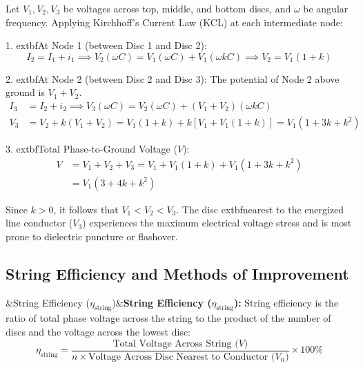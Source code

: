 \documentclass[11pt,a4paper]{article}
\newenvironment{Tip}[1][Key Engineering Insight]{\begin{tcolorbox}[tipbox, title=#1]}{\end{tcolorbox}}
\newenvironment{Def}[1][]{\begin{tcolorbox}[defbox]\ifx&#1&\else\textbf{\color{AnthOrange}#1:}\enspace\fi}{\end{tcolorbox}}
\newenvironment{Deriv}[1][Mathematical Derivation]{\begin{tcolorbox}[derivbox, title=#1]}{\end{tcolorbox}}
\begin{document}
\begin{Deriv}[Mathematical Derivation of Disc Voltages (3-Unit String)]
Let $V_1, V_2, V_3$ be voltages across top, middle, and bottom discs, and $\omega$ be angular frequency.
Applying Kirchhoff's Current Law (KCL) at each intermediate node:

1. 	extbf{At Node 1 (between Disc 1 and Disc 2):}
\begin{equation}
  I_2 = I_1 + i_1 \implies V_2 (\omega C) = V_1 (\omega C) + V_1 (\omega k C) \implies V_2 = V_1 (1 + k)
\end{equation}

2. 	extbf{At Node 2 (between Disc 2 and Disc 3):}
The potential of Node 2 above ground is $V_1 + V_2$.
\begin{align}
  I_3 &= I_2 + i_2 \implies V_3 (\omega C) = V_2 (\omega C) + (V_1 + V_2)(\omega k C) \nonumber\\
  V_3 &= V_2 + k (V_1 + V_2) = V_1 (1 + k) + k [V_1 + V_1(1 + k)] = V_1 \left( 1 + 3k + k^2 \right)
\end{align}

3. 	extbf{Total Phase-to-Ground Voltage ($V$):}
\begin{align}
  V &= V_1 + V_2 + V_3 = V_1 + V_1(1 + k) + V_1(1 + 3k + k^2) \nonumber\\
    &= V_1 \left( 3 + 4k + k^2 \right)
\end{align}
\end{Deriv}

\begin{Tip}[Key Observation: Non-Uniform Voltage Distribution]
Since $k > 0$, it follows that $V_1 < V_2 < V_3$. The disc 	extbf{nearest to the energized line conductor ($V_3$) experiences the maximum electrical voltage stress} and is most prone to dielectric puncture or flashover.
\end{Tip}

\subsection{String Efficiency and Methods of Improvement}

\begin{Def}[String Efficiency ($\eta_{\text{string}}$)]
String efficiency is the ratio of total phase voltage across the string to the product of the number of discs and the voltage across the lowest disc:
\begin{equation}
  \eta_{\text{string}} = \frac{\text{Total Voltage Across String ($V$)}}{n \times \text{Voltage Across Disc Nearest to Conductor ($V_n$)}} \times 100\%
\end{equation}
\end{Def}
\end{document}
